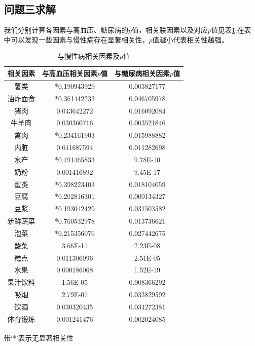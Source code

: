 \documentclass[withoutpreface,bwprint]{cumcmthesis} %
\begin{document}
\subsection{问题三求解}
我们分别计算各因素与高血压、糖尿病的$p$值，相关联因素以及对应$p$值见表\ref{bbb}:在表中可以发现一些因素与慢性病存在显著相关性，$p$值越小代表相关性越强。
\begin{table}[H]
\centering
\caption{与慢性病相关因素及$p$值
}
\label{bbb}\begin{threeparttable}
\begin{tabular}{ccc}
\hline
相关因素    & 与高血压相关因素$p$值       & 与糖尿病相关因素$p$值 \\ \hline
薯类      & *0.190943929 & 0.003827177  \\
油炸面食    & *0.361442233 & 0.046705978  \\
猪肉      & 0.043642272        & 0.016092084  \\
牛羊肉     & 0.030360716        & 0.003521846  \\
禽肉      & *0.234161903 & 0.015988882  \\
内脏      & 0.041687594        & 0.011282698  \\
水产      & *0.491465833 & 9.78E-10     \\
奶粉      & 0.001416892        & 9.45E-17     \\
蛋类      & *0.398223403 & 0.018104059  \\
豆腐      & *0.202816301 & 0.000134327  \\
豆浆      & *0.193012429 & 0.031503582  \\
新鲜蔬菜    & *0.760532978 & 0.013736621  \\
泡菜      & *0.215356076  & 0.027442675  \\
酸菜      & 3.66E-11           & 2.23E-08     \\
糕点      & 0.011306996        & 2.51E-05     \\
水果      & 0.000186068        & 1.52E-19     \\
果汁饮料    & 1.56E-05           & 0.008366292  \\
吸烟      & 2.79E-07           & 0.033829592  \\
饮酒      & 0.030320435        & 0.034272381  \\
体育锻炼 & 0.001241476        & 0.002024085  \\ \hline
\end{tabular}
\begin{tablenotes}    %
        \footnotesize               %
        \item[1] 带`*'表示无显著相关性
      \end{tablenotes}            %
    \end{threeparttable}       %
\end{table}
\end{document}
